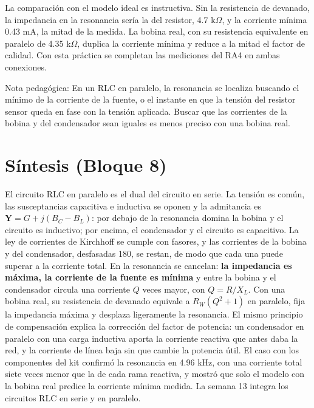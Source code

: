 \documentclass[11pt,letterpaper]{article}
\begin{document}
La comparación con el modelo ideal es instructiva. Sin la resistencia de devanado, la impedancia en la resonancia sería la del resistor, 4.7 k\ensuremath{\Omega}, y la corriente mínima 0.43 mA, la mitad de la medida. La bobina real, con su resistencia equivalente en paralelo de 4.35 k\ensuremath{\Omega}, duplica la corriente mínima y reduce a la mitad el factor de calidad. Con esta práctica se completan las mediciones del RA4 en ambas conexiones.

\begin{nota}{Nota pedagógica:}
En un RLC en paralelo, la resonancia se localiza buscando el mínimo de la corriente de la fuente, o el instante en que la tensión del resistor sensor queda en fase con la tensión aplicada. Buscar que las corrientes de la bobina y del condensador sean iguales es menos preciso con una bobina real.
\end{nota}

\section{Síntesis (Bloque 8)}

El circuito RLC en paralelo es el dual del circuito en serie. La tensión es común, las susceptancias capacitiva e inductiva se oponen y la admitancia es $\mathbf{Y} = G + j(B_C - B_L)$: por debajo de la resonancia domina la bobina y el circuito es inductivo; por encima, el condensador y el circuito es capacitivo. La ley de corrientes de Kirchhoff se cumple con fasores, y las corrientes de la bobina y del condensador, desfasadas 180\textdegree{}, se restan, de modo que cada una puede superar a la corriente total. En la resonancia se cancelan: \textbf{la impedancia es máxima, la corriente de la fuente es mínima} y entre la bobina y el condensador circula una corriente $Q$ veces mayor, con $Q = R/X_L$. Con una bobina real, su resistencia de devanado equivale a $R_W(Q^2 + 1)$ en paralelo, fija la impedancia máxima y desplaza ligeramente la resonancia. El mismo principio de compensación explica la corrección del factor de potencia: un condensador en paralelo con una carga inductiva aporta la corriente reactiva que antes daba la red, y la corriente de línea baja sin que cambie la potencia útil. El caso con los componentes del kit confirmó la resonancia en 4.96 kHz, con una corriente total siete veces menor que la de cada rama reactiva, y mostró que solo el modelo con la bobina real predice la corriente mínima medida. La semana 13 integra los circuitos RLC en serie y en paralelo.
\end{document}
